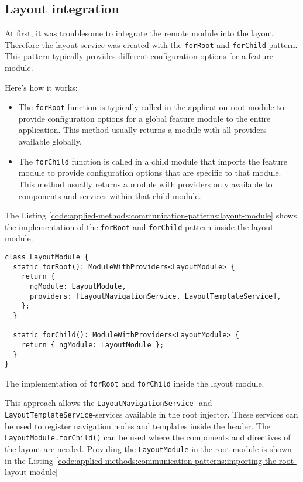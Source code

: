 \subsection{Layout integration}\label{subsection:applied-methods:communication-patterns:layout-integration}

At first, it was troublesome to integrate the remote module into the layout. Therefore the layout service was created with the \texttt{forRoot} and \texttt{forChild} pattern. This pattern typically provides different configuration options for a feature module.

\bigskip

\noindent Here's how it works:

\begin{itemize}
  \item The \texttt{forRoot} function is typically called in the application root module to provide configuration options for a global feature module to the entire application. This method usually returns a module with all providers available globally.
  \item The \texttt{forChild} function is called in a child module that imports the feature module to provide configuration options that are specific to that module. This method usually returns a module with providers only available to components and services within that child module.
\end{itemize}

\noindent The Listing \ref{code:applied-methods:communication-patterns:layout-module} shows the implementation of the \texttt{forRoot} and \texttt{forChild} pattern inside the layout-module.

\ifshowListings
  \begin{listing}[H]
  \begin{verbatim}
class LayoutModule {
  static forRoot(): ModuleWithProviders<LayoutModule> {
    return {
      ngModule: LayoutModule,
      providers: [LayoutNavigationService, LayoutTemplateService],
    };
  }

  static forChild(): ModuleWithProviders<LayoutModule> {
    return { ngModule: LayoutModule };
  }
}
  \end{verbatim}
  \caption{The implementation of \texttt{forRoot} and \texttt{forChild} inside the layout module.}\label{code:applied-methods:communication-patterns:layout-module}
  \end{listing}
\fi

\noindent This approach allows the \texttt{LayoutNavigationService}- and \texttt{LayoutTemplateService}-services available in the root injector. These services can be used to register navigation nodes and templates inside the header. The \texttt{LayoutModule.forChild()} can be used where the components and directives of the layout are needed. Providing the \texttt{LayoutModule} in the root module is shown in the Listing \ref{code:applied-methods:communication-patterns:importing-the-root-layout-module}

